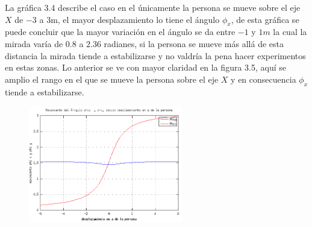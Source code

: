      La gráfica 3.4 describe el caso en el únicamente la  persona se mueve sobre el eje $X$ de $-3$ a $3$m, el mayor desplazamiento lo tiene el ángulo $\phi_x$, de esta gráfica se puede concluir que la mayor variación en el ángulo se da entre $-1$ y $1m$ la cual la mirada varía de $0.8$ a $2.36$ radianes, si la persona se mueve más allá de esta distancia la mirada tiende a estabilizarse y no valdría la pena hacer experimentos en estas zonas. Lo anterior se ve con mayor claridad en la figura 3.5, aquí se amplio el rango en el que se mueve la persona sobre el eje $X$ y en consecuencia $\phi_x$ tiende a estabilizarse.
     \begin{figure}[htbp]
     	\centering
     	\includegraphics[width=0.6\textwidth]{./pictures/figure5}
     	\caption{}\label{fig: figura}
     \end{figure}
     
